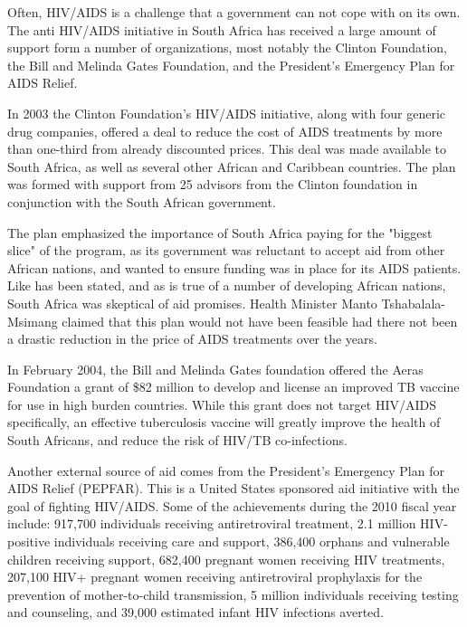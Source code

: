\documentclass[12pt]{report}
\begin{document}
Often, HIV/AIDS is a challenge that a government can not cope with on its own.  
The anti HIV/AIDS initiative in South Africa has received a large amount of support form a number of organizations, most notably the Clinton Foundation, the Bill and Melinda Gates Foundation, and the President's Emergency Plan for AIDS Relief.

In 2003 the Clinton Foundation's HIV/AIDS initiative, along with four generic drug companies, offered a deal to reduce the cost of AIDS treatments by more than one-third from already discounted prices.
This deal was made available to South Africa, as well as several other African and Caribbean countries.
The plan was formed with support from 25 advisors from the Clinton foundation in conjunction with the South African government.

The plan emphasized the importance of South Africa paying for the "biggest slice" of the program, as its government was reluctant to accept aid from other African nations, and wanted to ensure funding was in place for its AIDS patients.
Like has been stated, and as is true of a number of developing African nations, South Africa was skeptical of aid promises.
Health Minister Manto Tshabalala-Msimang claimed that this plan would not have been feasible had there not been a drastic reduction in the price of AIDS treatments over the years.


In February 2004, the Bill and Melinda Gates foundation offered the Aeras Foundation a grant of \$82 million to develop and license an improved TB vaccine for use in high burden countries\cite{gates}.
While this grant does not target HIV/AIDS specifically, an effective tuberculosis vaccine will greatly improve the health of South Africans, and reduce the risk of HIV/TB co-infections.

Another external source of aid comes from the President's Emergency Plan for AIDS Relief (PEPFAR).
This is a United States sponsored aid initiative with the goal of fighting HIV/AIDS.
Some of the achievements during the 2010 fiscal year include: 
    917,700 individuals receiving antiretroviral treatment, 
    2.1 million HIV-positive individuals receiving care and support, 
    386,400 orphans and vulnerable children receiving support, 
    682,400 pregnant women receiving HIV treatments, 
    207,100 HIV+ pregnant women receiving antiretroviral prophylaxis for the prevention of mother-to-child transmission, 
    5 million individuals receiving testing and counseling, 
    and 39,000 estimated infant HIV infections averted\cite{pepfar}.
\end{document}
